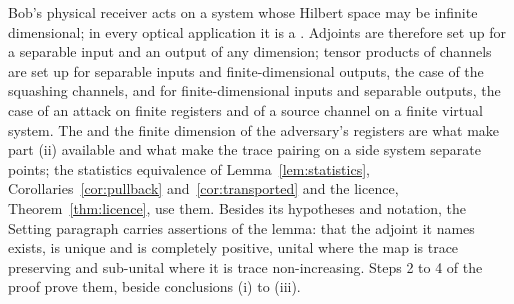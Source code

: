 
Bob's physical receiver acts on a system whose Hilbert space may be infinite
dimensional; in every optical application it is a . Adjoints
are therefore set up for a separable input and an output of any dimension;
tensor products of channels are set up for separable inputs and
finite-dimensional outputs, the case of the squashing channels, and for
finite-dimensional inputs and separable outputs, the case of an attack on
finite registers and of a source channel on a finite virtual system. The  and the finite
dimension of the adversary's registers are what make part (ii) available and
what make the trace pairing on a side system separate points; the statistics
equivalence of Lemma~\ref{lem:statistics},
Corollaries~\ref{cor:pullback} and~\ref{cor:transported} and the licence,
Theorem~\ref{thm:licence}, use them. Besides its hypotheses and notation, the
Setting paragraph carries assertions of the lemma: that the adjoint it names
exists, is unique and is completely positive, unital where the map is trace
preserving and sub-unital where it is trace non-increasing. Steps 2 to 4 of
the proof prove them, beside conclusions (i) to (iii).

